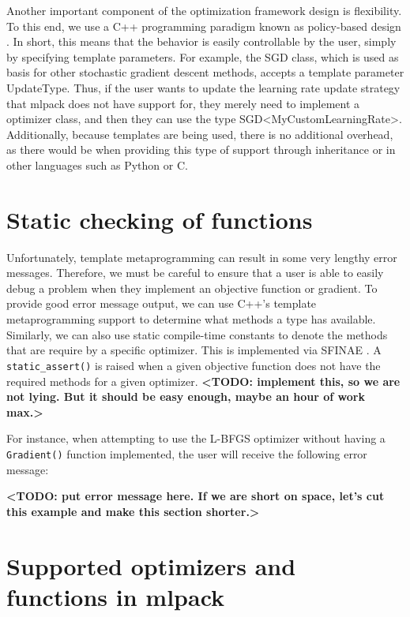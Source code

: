 \documentclass{article}
\begin{document}
Another important component of the optimization framework design is flexibility.
To this end, we use a C++ programming paradigm known as policy-based design
\cite{Alexandrescu2001}. In short, this means that the behavior is easily
controllable by the user, simply by specifying template parameters. For example,
the SGD class, which is used as basis for other stochastic gradient descent
methods, accepts a template parameter UpdateType. Thus, if the user wants to
update the learning rate update strategy that mlpack does not have support for,
they merely need to implement a optimizer class, and then they can use the type
SGD<MyCustomLearningRate>. Additionally, because templates are being used, there
is no additional overhead, as there would be when providing this type of support
through inheritance or in other languages such as Python or C.

\section{Static checking of functions}

{\bf <TODO: probably a better section title>}

Unfortunately, template metaprogramming can result in some very lengthy error
messages.  Therefore, we must be careful to ensure that a user is able to easily
debug a problem when they implement an objective function or gradient.  To
provide good error message output, we can use C++'s template metaprogramming
support to determine what methods a type has available.  Similarly, we can also
use static compile-time constants to denote the methods that are require by a
specific optimizer.  This is implemented via SFINAE \cite{sfinae}.  A {\tt
static\_assert()} is raised when a given objective function does not have the
required methods for a given optimizer.  {\bf <TODO: implement this, so we are
not lying.  But it should be easy enough, maybe an hour of work max.>}

For instance, when attempting to use the L-BFGS optimizer without having a
{\tt Gradient()} function implemented, the user will receive the following error
message:

{\bf <TODO: put error message here.  If we are short on space, let's cut this
example and make this section shorter.>}

\section{Supported optimizers and functions in mlpack}
\end{document}
